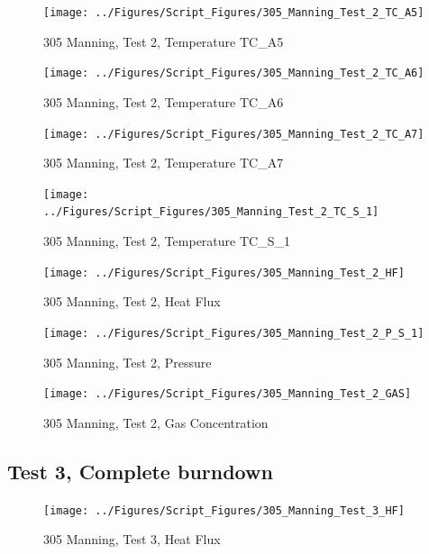 \documentclass[12pt,oneside]{book}
\begin{document}
\begin{figure}[!ht]
\texttt{[image: ../Figures/Script\_Figures/305\_Manning\_Test\_2\_TC\_A5]}
\caption{305 Manning, Test 2, Temperature TC\_A5}
\label{fig:305_Manning_Test_2_TC_A5}
\end{figure}

\begin{figure}[!ht]
\texttt{[image: ../Figures/Script\_Figures/305\_Manning\_Test\_2\_TC\_A6]}
\caption{305 Manning, Test 2, Temperature TC\_A6}
\label{fig:305_Manning_Test_2_TC_A6}
\end{figure}

\begin{figure}[!ht]
\texttt{[image: ../Figures/Script\_Figures/305\_Manning\_Test\_2\_TC\_A7]}
\caption{305 Manning, Test 2, Temperature TC\_A7}
\label{fig:305_Manning_Test_2_TC_A7}
\end{figure}

\begin{figure}[!ht]
\texttt{[image: ../Figures/Script\_Figures/305\_Manning\_Test\_2\_TC\_S\_1]}
\caption{305 Manning, Test 2, Temperature TC\_S\_1}
\label{fig:305_Manning_Test_2_TC_S_1}
\end{figure}

\begin{figure}[!ht]
\texttt{[image: ../Figures/Script\_Figures/305\_Manning\_Test\_2\_HF]}
\caption{305 Manning, Test 2, Heat Flux}
\label{fig:305_Manning_Test_2_HF}
\end{figure}

\begin{figure}[!ht]
\texttt{[image: ../Figures/Script\_Figures/305\_Manning\_Test\_2\_P\_S\_1]}
\caption{305 Manning, Test 2, Pressure}
\label{fig:305_Manning_Test_2_P_S_1}
\end{figure}

\begin{figure}[!ht]
\texttt{[image: ../Figures/Script\_Figures/305\_Manning\_Test\_2\_GAS]}
\caption{305 Manning, Test 2, Gas Concentration}
\label{fig:305_Manning_Test_2_GAS}
\end{figure}


\clearpage


\subsection{Test 3, Complete burndown}

\begin{figure}[!ht]
\texttt{[image: ../Figures/Script\_Figures/305\_Manning\_Test\_3\_HF]}
\caption{305 Manning, Test 3, Heat Flux}
\label{fig:305_Manning_Test_3_HF}
\end{figure}
\end{document}
